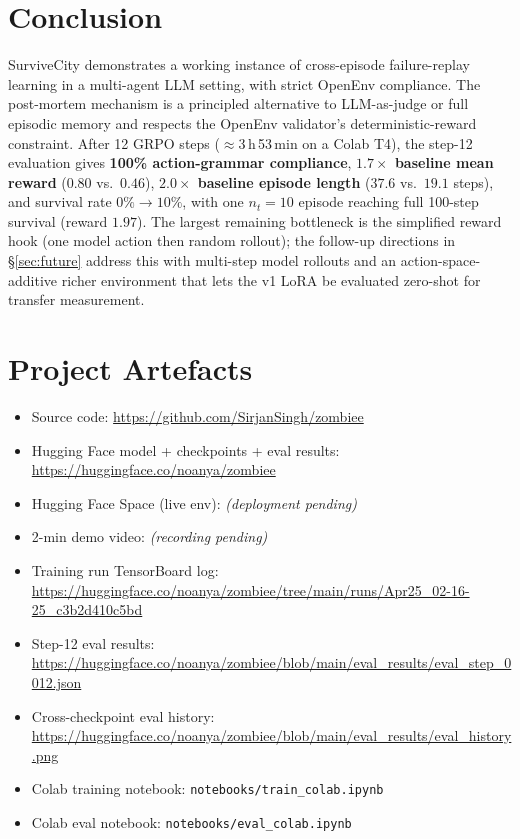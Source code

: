 \documentclass[11pt,a4paper]{article}
\begin{document}
\section{Conclusion}

SurviveCity demonstrates a working instance of cross-episode failure-replay
learning in a multi-agent LLM setting, with strict OpenEnv compliance. The
post-mortem mechanism is a principled alternative to LLM-as-judge or full
episodic memory and respects the OpenEnv validator's deterministic-reward
constraint. After 12 GRPO steps ($\approx$3\,h\,53\,min on a Colab T4), the
step-12 evaluation gives \textbf{100\% action-grammar compliance},
\textbf{$1.7\!\times$ baseline mean reward} ($0.80$ vs.\ $0.46$),
\textbf{$2.0\!\times$ baseline episode length} ($37.6$ vs.\ $19.1$ steps),
and survival rate $0\%\rightarrow 10\%$, with one $n_t{=}10$ episode reaching
full 100-step survival (reward $1.97$). The largest remaining bottleneck is
the simplified reward hook (one model action then random rollout); the
follow-up directions in §\ref{sec:future} address this with multi-step model
rollouts and an action-space-additive richer environment that lets the v1
LoRA be evaluated zero-shot for transfer measurement.

\section*{Project Artefacts}

\begin{itemize}[leftmargin=*,nosep]
  \item Source code: \url{https://github.com/SirjanSingh/zombiee}
  \item Hugging Face model + checkpoints + eval results:
        \url{https://huggingface.co/noanya/zombiee}
  \item Hugging Face Space (live env): \textit{(deployment pending)}
  \item 2-min demo video: \textit{(recording pending)}
  \item Training run TensorBoard log: \url{https://huggingface.co/noanya/zombiee/tree/main/runs/Apr25_02-16-25_c3b2d410c5bd}
  \item Step-12 eval results: \url{https://huggingface.co/noanya/zombiee/blob/main/eval_results/eval_step_0012.json}
  \item Cross-checkpoint eval history: \url{https://huggingface.co/noanya/zombiee/blob/main/eval_results/eval_history.png}
  \item Colab training notebook: \texttt{notebooks/train\_colab.ipynb}
  \item Colab eval notebook:     \texttt{notebooks/eval\_colab.ipynb}
\end{itemize}



\end{document}
